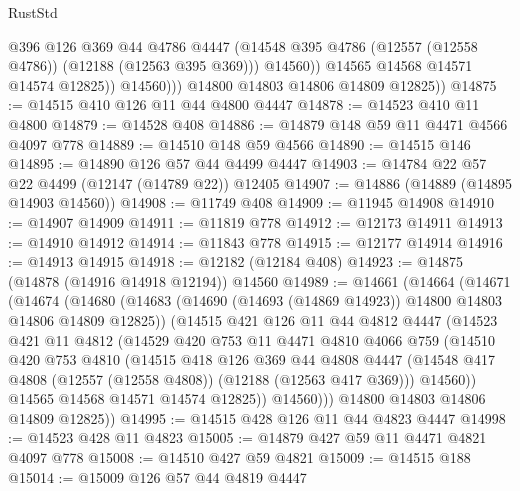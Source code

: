 \begin{lexlean}{RustStd}
\begin{coremodule}
{\begin{coremodule}
{{{{{{{{{{{{{{{{{{{{{{{{{{{{{{{{{{{{{{{{{{{{{{{{{{{{{{{{{{{{{{{{{{{{                      @396
                      @126
                      @369
                      @44
                      @4786
                      @4447
                      (@14548 @395 @4786 (@12557 (@12558 @4786)) (@12188 (@12563 @395 @369)))
                      @14560))
                  @14565
                  @14568
                  @14571
                  @14574
                  @12825))
              @14560)))
        @14800
        @14803
        @14806
        @14809
        @12825))
@14875 := @14515 @410 @126 @11 @44 @4800 @4447
@14878 := @14523 @410 @11 @4800
@14879 := @14528 @408
@14886 := @14879 @148 @59 @11 @4471 @4566 @4097 @778
@14889 := @14510 @148 @59 @4566
@14890 := @14515 @146
@14895 := @14890 @126 @57 @44 @4499 @4447
@14903 := @14784 @22 @57 @22 @4499 (@12147 (@14789 @22)) @12405
@14907 := @14886 (@14889 (@14895 @14903 @14560))
@14908 := @11749 @408
@14909 := @11945 @14908
@14910 := @14907 @14909
@14911 := @11819 @778
@14912 := @12173 @14911
@14913 := @14910 @14912
@14914 := @11843 @778
@14915 := @12177 @14914
@14916 := @14913 @14915
@14918 := @12182 (@12184 @408)
@14923 := @14875 (@14878 (@14916 @14918 @12194)) @14560
@14989 := @14661
    (@14664
      (@14671
        (@14674
          (@14680
            (@14683 (@14690 (@14693 (@14869 @14923)) @14800 @14803 @14806 @14809 @12825))
            (@14515
              @421
              @126
              @11
              @44
              @4812
              @4447
              (@14523
                @421
                @11
                @4812
                (@14529
                  @420
                  @753
                  @11
                  @4471
                  @4810
                  @4066
                  @759
                  (@14510
                    @420
                    @753
                    @4810
                    (@14515
                      @418
                      @126
                      @369
                      @44
                      @4808
                      @4447
                      (@14548 @417 @4808 (@12557 (@12558 @4808)) (@12188 (@12563 @417 @369)))
                      @14560))
                  @14565
                  @14568
                  @14571
                  @14574
                  @12825))
              @14560)))
        @14800
        @14803
        @14806
        @14809
        @12825))
@14995 := @14515 @428 @126 @11 @44 @4823 @4447
@14998 := @14523 @428 @11 @4823
@15005 := @14879 @427 @59 @11 @4471 @4821 @4097 @778
@15008 := @14510 @427 @59 @4821
@15009 := @14515 @188
@15014 := @15009 @126 @57 @44 @4819 @4447
}}}}}}}}}}}}}}}}}}}}}}}}}}}}}}}}}}}}}}}}}}}}}}}}}}}}}}}}}}}}}}}}}}}}
\end{coremodule}}
\end{coremodule}
\end{lexlean}
